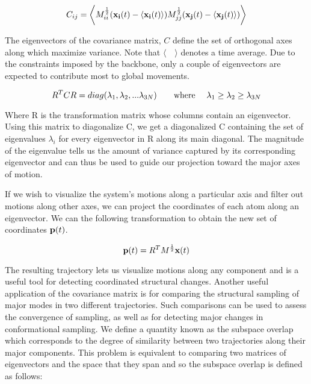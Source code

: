 \begin{equation}
C_{ij} = \bigg\langle M_{ii}^{\frac{1}{2}} (\mathbf{x_i}(t) - \langle \mathbf{x_i}(t) \rangle) M_{jj}^{\frac{1}{2}} (\mathbf{x_j}(t) - \langle \mathbf{x_j}(t) \rangle) \bigg\rangle
\end{equation}

The eigenvectors of the covariance matrix, $C$ define the set of orthogonal axes along which maximize variance. Note that $\langle \quad \rangle$ denotes a time average. Due to the constraints imposed by the backbone, only a couple of eigenvectors are expected to contribute most to global movements.

\begin{equation}
R^{T}CR = diag(\lambda_1, \lambda_2, ... \lambda_{3N}) \text{\qquad where \quad} \lambda_1 \geq \lambda_2 \geq \lambda_{3N}
\end{equation}

Where R is the transformation matrix whose columns contain an eigenvector. Using this matrix to diagonalize C, we get a diagonalized C containing the set of eigenvalues $\lambda_i$ for every eigenvector in R along its main diagonal. The magnitude of the eigenvalue tells us the amount of variance captured by its corresponding eigenvector and can thus be used to guide our projection toward the major axes of motion.

If we wish to visualize the system's motions along a particular axis and filter out motions along other axes, we can project the coordinates of each atom along an eigenvector. We can the following transformation to obtain the new set of coordinates $\mathbf{p}(t)$.

\begin{equation}
\mathbf{p}(t) = R^{T}M^{\frac{1}{2}}\mathbf{x}(t)
\end{equation}

The resulting trajectory lets us visualize motions along any component and is a useful tool for detecting coordinated structural changes. Another useful application of the covariance matrix is for comparing the structural sampling of major modes in two different trajectories. Such comparisons can be used to assess the convergence of sampling, as well as for detecting major changes in conformational sampling. We define a quantity known as the subspace overlap which corresponds to the degree of similarity between two trajectories along their major components. This problem is equivalent to comparing two matrices of eigenvectors and the space that they span and so the subspace overlap is defined as follows:

